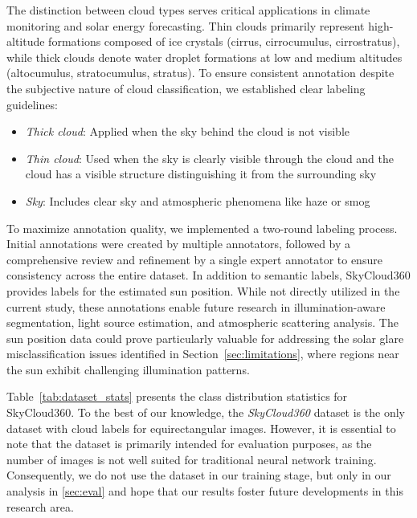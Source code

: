 \documentclass[conference]{IEEEtran}
\begin{document}
The distinction between cloud types serves critical applications in climate monitoring and solar energy forecasting. Thin clouds primarily represent high-altitude formations composed of ice crystals (cirrus, cirrocumulus, cirrostratus), while thick clouds denote water droplet formations at low and medium altitudes (altocumulus, stratocumulus, stratus). To ensure consistent annotation despite the subjective nature of cloud classification, we established clear labeling guidelines:

\begin{itemize}
\item \textit{Thick cloud}: Applied when the sky behind the cloud is not visible
\item \textit{Thin cloud}: Used when the sky is clearly visible through the cloud and the cloud has a visible structure distinguishing it from the surrounding sky
\item \textit{Sky}: Includes clear sky and atmospheric phenomena like haze or smog
\end{itemize}

To maximize annotation quality, we implemented a two-round labeling process. Initial annotations were created by multiple annotators, followed by a comprehensive review and refinement by a single expert annotator to ensure consistency across the entire dataset.
In addition to semantic labels, SkyCloud360 provides labels for the estimated sun position. 
While not directly utilized in the current study, these annotations enable future research in illumination-aware segmentation, light source estimation, and atmospheric scattering analysis. 
The sun position data could prove particularly valuable for addressing the solar glare misclassification issues identified in Section~\ref{sec:limitations}, where regions near the sun exhibit challenging illumination patterns.

Table~\ref{tab:dataset_stats} presents the class distribution statistics for SkyCloud360.
To the best of our knowledge, the \textit{SkyCloud360} dataset is the only dataset with cloud labels for equirectangular images.   
However, it is essential to note that the dataset is primarily intended for evaluation purposes, as the number of images is not well suited for traditional neural network training. 
Consequently, we do not use the dataset in our training stage, but only in our analysis in \cref{sec:eval} and hope that our results foster future developments in this research area.

\end{document}
